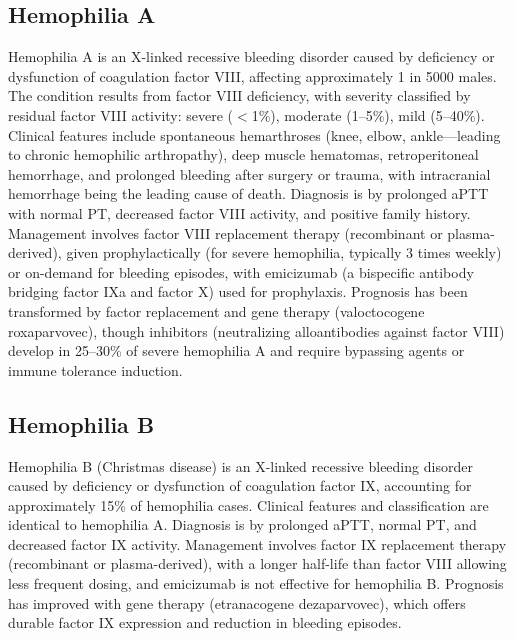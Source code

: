 \subsection{Hemophilia A}
\label{sec:Hemophilia A}
Hemophilia A is an X-linked recessive bleeding disorder caused by deficiency or dysfunction of coagulation factor VIII, affecting approximately 1 in 5000 males. The condition results from factor VIII deficiency, with severity classified by residual factor VIII activity: severe ($<$1\%), moderate (1--5\%), mild (5--40\%). Clinical features include spontaneous hemarthroses (knee, elbow, ankle---leading to chronic hemophilic arthropathy), deep muscle hematomas, retroperitoneal hemorrhage, and prolonged bleeding after surgery or trauma, with intracranial hemorrhage being the leading cause of death. Diagnosis is by prolonged aPTT with normal PT, decreased factor VIII activity, and positive family history. Management involves factor VIII replacement therapy (recombinant or plasma-derived), given prophylactically (for severe hemophilia, typically 3 times weekly) or on-demand for bleeding episodes, with emicizumab (a bispecific antibody bridging factor IXa and factor X) used for prophylaxis. Prognosis has been transformed by factor replacement and gene therapy (valoctocogene roxaparvovec), though inhibitors (neutralizing alloantibodies against factor VIII) develop in 25--30\% of severe hemophilia A and require bypassing agents or immune tolerance induction.

\subsection{Hemophilia B}
\label{sec:Hemophilia B}
Hemophilia B (Christmas disease) is an X-linked recessive bleeding disorder caused by deficiency or dysfunction of coagulation factor IX, accounting for approximately 15\% of hemophilia cases. Clinical features and classification are identical to hemophilia A. Diagnosis is by prolonged aPTT, normal PT, and decreased factor IX activity. Management involves factor IX replacement therapy (recombinant or plasma-derived), with a longer half-life than factor VIII allowing less frequent dosing, and emicizumab is not effective for hemophilia B. Prognosis has improved with gene therapy (etranacogene dezaparvovec), which offers durable factor IX expression and reduction in bleeding episodes.

